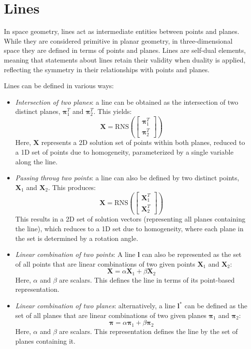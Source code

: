 \section{Lines}

In space geometry, lines act as intermediate entities between points and planes. 
While they are considered primitive in planar geometry, in three-dimensional space they are defined in terms of points and planes.
Lines are self-dual elements, meaning that statements about lines retain their validity when duality is applied, reflecting the symmetry in their relationships with points and planes.

Lines can be defined in various ways:
\begin{itemize}
    \item \textit{Intersection of two planes}: a line can be obtained as the intersection of two distinct planes, $\boldsymbol{\pi}_1^T$ and $\boldsymbol{\pi}_2^T$. 
        This yields: 
        \[\mathbf{X}=\text{RNS}\left(\begin{bmatrix} \boldsymbol{\pi}_1^T \\ \boldsymbol{\pi}_2^T \end{bmatrix}\right)\]
        Here, $\mathbf{X}$ represents a 2D solution set of points within both planes, reduced to a 1D set of points due to homogeneity, parameterized by a single variable along the line.
    \item \textit{Passing throug two points}: a line can also be defined by two distinct points, $\mathbf{X}_1$ and $\mathbf{X}_2$. 
        This produces:
        \[\mathbf{X}=\text{RNS}\left(\begin{bmatrix} \mathbf{X}_1^T \\ \mathbf{X}_2^T \end{bmatrix}\right)\]
        This results in a 2D set of solution vectors (representing all planes containing the line), which reduces to a 1D set due to homogeneity, where each plane in the set is determined by a rotation angle.
    \item \textit{Linear combination of two points}: A line $\mathbf{l}$ can also be represented as the set of all points that are linear combinations of two given points $\mathbf{X}_1$ and $\mathbf{X}_2$:
        \[\mathbf{X}=\alpha\mathbf{X}_1+\beta\mathbf{X}_2\]
        Here, $\alpha$ and $\beta$ are scalars. 
        This defines the line in terms of its point-based representation.
    \item \textit{Linear combination of two planes}: alternatively, a line $\mathbf{l}^\ast$ can be defined as the set of all planes that are linear combinations of two given planes $\boldsymbol{\pi}_1$ and $\boldsymbol{\pi}_2$:
        \[\boldsymbol{\pi} = \alpha \boldsymbol{\pi}_1 + \beta\boldsymbol{\pi}_2\] 
        Here, $\alpha$ and $\beta$ are scalars. 
        This representation defines the line by the set of planes containing it.
\end{itemize}
